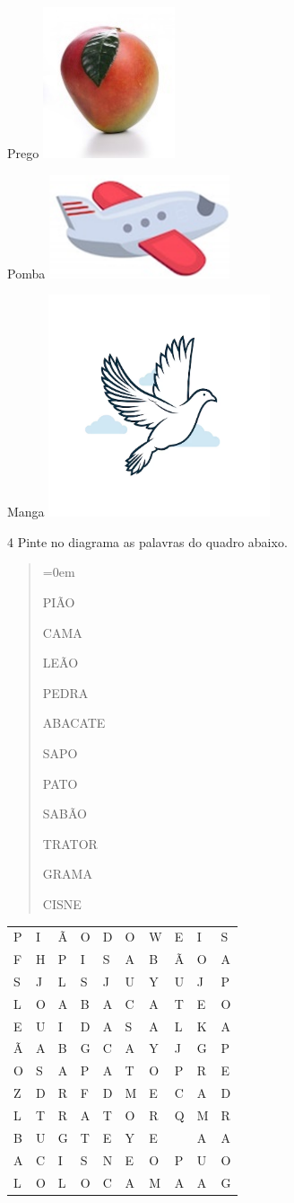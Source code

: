 Prego \hfill\includegraphics[width=.1\textwidth]{media/image64.jpeg}

Pomba \hfill\includegraphics[width=.1\textwidth]{media/image65.png}

Manga \hfill\includegraphics[width=.1\textwidth]{media/image66.png}


\pagebreak
\num{4} Pinte no diagrama as palavras do quadro abaixo.


\begin{quote}\parindent=0em
\vspace*{-.5cm}
\begin{multicols}{3}
PIÃO

CAMA

LEÃO

PEDRA

ABACATE

SAPO

PATO

SABÃO

TRATOR

GRAMA

CISNE
\end{multicols}
\end{quote}

\begin{longtable}[]{@{}llllllllll@{}}
\toprule
P & I & Ã & O & D & O & W & E & I & S\tabularnewline
F & H & P & I & S & A & B & Ã & O & A\tabularnewline
S & J & L & S & J & U & Y & U & J & P\tabularnewline
L & O & A & B & A & C & A & T & E & O\tabularnewline
E & U & I & D & A & S & A & L & K & A\tabularnewline
Ã & A & B & G & C & A & Y & J & G & P\tabularnewline
O & S & A & P & A & T & O & P & R & E\tabularnewline
Z & D & R & F & D & M & E & C & A & D\tabularnewline
L & T & R & A & T & O & R & Q & M & R\tabularnewline
B & U & G & T & E & Y & E & & A & A\tabularnewline
A & C & I & S & N & E & O & P & U & O\tabularnewline
L & O & L & O & C & A & M & A & A & G\tabularnewline
\bottomrule
\end{longtable}

